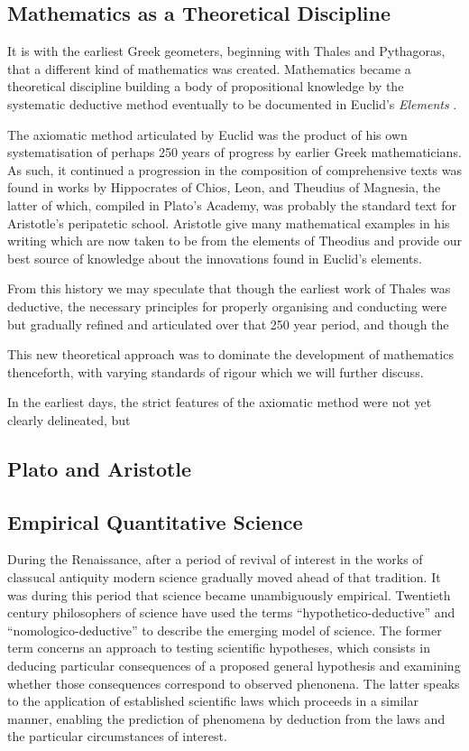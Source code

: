 \documentclass[10pt,titlepage]{book}
\begin{document}
\subsection{Mathematics as a Theoretical Discipline}

It is with the earliest Greek geometers, beginning with Thales and Pythagoras, that a different kind of mathematics was created.
Mathematics became a theoretical discipline building a body of propositional knowledge by the systematic deductive method eventually to be documented in Euclid's \emph{Elements} \cite{euclidEL1}.

The axiomatic method articulated by Euclid was the product of his own systematisation of perhaps 250 years of progress by earlier Greek mathematicians.
As such, it continued a progression in the composition of comprehensive texts was found in works by Hippocrates of Chios, Leon, and Theudius of Magnesia, the latter of which, compiled in Plato's Academy, was probably the standard text for Aristotle's peripatetic school.
Aristotle give many mathematical examples in his writing which are now taken to be from the elements of Theodius and provide our best source of knowledge about the innovations found in Euclid's elements.

From this history we may speculate that though the earliest work of Thales was deductive, the necessary principles for properly organising and conducting were but gradually refined and articulated over that 250 year period, and though the 



This new theoretical approach was to dominate the development of mathematics thenceforth, with varying standards of rigour which we will further discuss.

In the earliest days, the strict features of the axiomatic method were not yet clearly delineated, but 

\subsection{Plato and Aristotle}

\subsection{Empirical Quantitative Science}

During the Renaissance, after a period of revival of interest in the works of classucal antiquity modern science gradually moved ahead of that tradition.
It was during this period that science became unambiguously empirical.
Twentieth century philosophers of science have used the terms ``hypothetico-deductive'' and ``nomologico-deductive'' to describe the emerging model of science.
The former term concerns an approach to testing scientific hypotheses, which consists in deducing particular consequences of a proposed general hypothesis and examining whether those consequences correspond to observed phenonena.
The latter speaks to the application of established scientific laws which proceeds in a similar manner, enabling the prediction of phenomena by deduction from the laws and the particular circumstances of interest.
\end{document}

